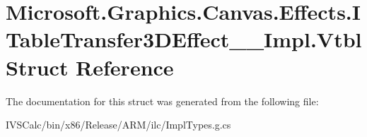 \hypertarget{struct_microsoft_1_1_graphics_1_1_canvas_1_1_effects_1_1_i_table_transfer3_d_effect_____impl_1_1_vtbl}{}\section{Microsoft.\+Graphics.\+Canvas.\+Effects.\+I\+Table\+Transfer3\+D\+Effect\+\_\+\+\_\+\+Impl.\+Vtbl Struct Reference}
\label{struct_microsoft_1_1_graphics_1_1_canvas_1_1_effects_1_1_i_table_transfer3_d_effect_____impl_1_1_vtbl}


The documentation for this struct was generated from the following file\+:\begin{DoxyCompactItemize}
\item 
I\+V\+S\+Calc/bin/x86/\+Release/\+A\+R\+M/ilc/Impl\+Types.\+g.\+cs\end{DoxyCompactItemize}
